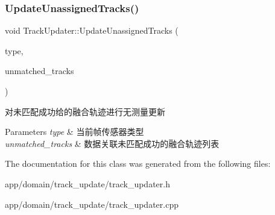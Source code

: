 \subsubsection{\texorpdfstring{Update\+Unassigned\+Tracks()}{UpdateUnassignedTracks()}}
{\footnotesize\ttfamily void Track\+Updater\+::\+Update\+Unassigned\+Tracks (\begin{DoxyParamCaption}\item[{const Sensor\+Type}]{type,  }\item[{const std\+::vector$<$ uint32\+\_\+t $>$ \&}]{unmatched\+\_\+tracks }\end{DoxyParamCaption})}



对未匹配成功给的融合轨迹进行无测量更新 


\begin{DoxyParams}{Parameters}
{\em type} & 当前帧传感器类型 \\
\hline
{\em unmatched\+\_\+tracks} & 数据关联未匹配成功的融合轨迹列表 \\
\hline
\end{DoxyParams}


The documentation for this class was generated from the following files\+:\begin{DoxyCompactItemize}
\item 
app/domain/track\+\_\+update/track\+\_\+updater.\+h\item 
app/domain/track\+\_\+update/track\+\_\+updater.\+cpp\end{DoxyCompactItemize}
